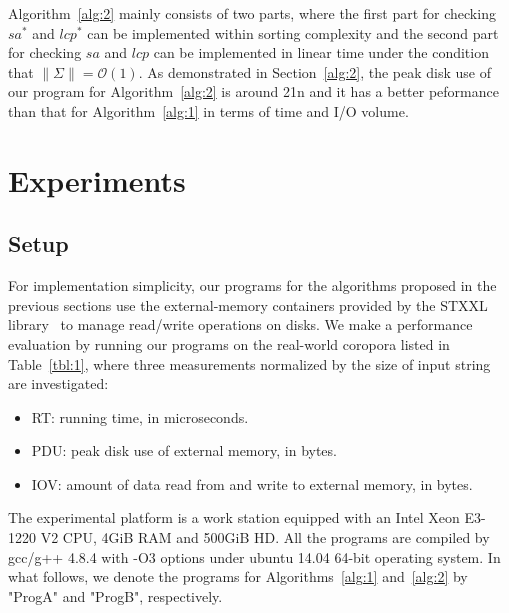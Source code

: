 \documentclass[10pt,journal,compsoc]{IEEEtran}
\begin{document}
Algorithm~\ref{alg:2} mainly consists of two parts, where the first part for checking $sa^*$ and $lcp^*$ can be implemented within sorting complexity and the second part for checking $sa$ and $lcp$ can be implemented in linear time under the condition that $\|\Sigma\| = \mathcal{O}(1)$. As demonstrated in Section~\ref{alg:2}, the peak disk use of our program for Algorithm~\ref{alg:2} is around 21n and it has a better peformance than that for Algorithm~\ref{alg:1} in terms of time and I/O volume.

\section{Experiments} \label{sec:experiment}

\subsection{Setup} \label{sec:experiment:setup}

For implementation simplicity, our programs for the algorithms proposed in the previous sections use the external-memory containers provided by the STXXL library~\cite{Dementiev2007} to manage read/write operations on disks. We make a performance evaluation by running our programs on the real-world coropora listed in Table~\ref{tbl:1}, where three measurements normalized by the size of input string are investigated:

\begin{itemize}
	
	\item RT: running time, in microseconds.
	
	\item PDU: peak disk use of external memory, in bytes.
	
	\item IOV: amount of data read from and write to external memory, in bytes.
	
\end{itemize}

The experimental platform is a work station equipped with an Intel Xeon E3-1220 V2 CPU, 4GiB RAM and 500GiB HD. All the programs are compiled by gcc/g++ 4.8.4 with -O3 options under ubuntu 14.04 64-bit operating system. In what follows, we denote the programs for Algorithms~\ref{alg:1} and~\ref{alg:2} by "ProgA" and "ProgB", respectively. 
	
\end{document}

